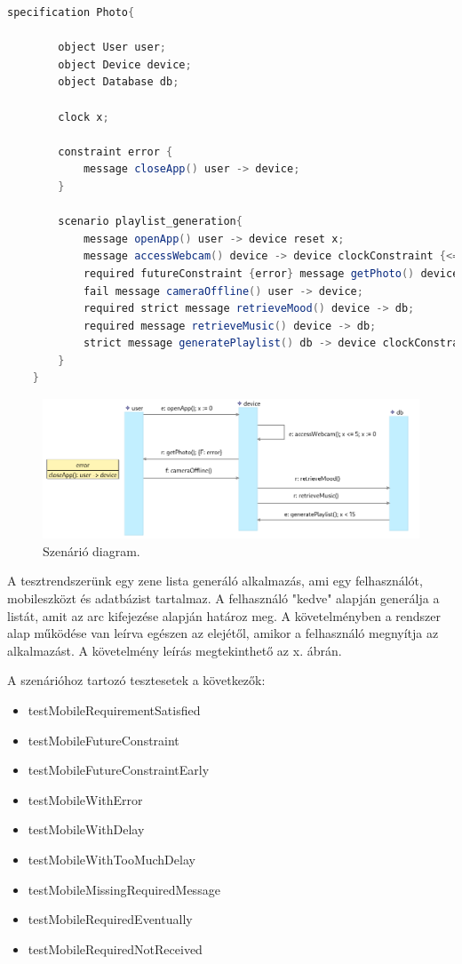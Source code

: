 \begin{lstlisting}[language=java, frame=single, float=ht!, caption={Integrációs teszteset.},captionpos=b]
    specification Photo{

        object User user;
        object Device device;
        object Database db;

        clock x;

        constraint error {
            message closeApp() user -> device;
        }

        scenario playlist_generation{
            message openApp() user -> device reset x;
            message accessWebcam() device -> device clockConstraint {<=(x, 5)} reset x;
            required futureConstraint {error} message getPhoto() device -> user;
            fail message cameraOffline() user -> device;
            required strict message retrieveMood() device -> db;
            required message retrieveMusic() device -> db;
            strict message generatePlaylist() db -> device clockConstraint {<(x, 15)};
        }
    }
\end{lstlisting}

\begin{figure}[!ht]
    \centering
    \includegraphics[width=150mm, keepaspectratio]{figures/diagramMobileExample.png}
    \caption{Szenárió diagram.}
\end{figure}

A tesztrendszerünk egy zene lista generáló alkalmazás, ami egy felhasználót, mobileszközt és adatbázist tartalmaz.
A felhasználó "kedve" alapján generálja a listát, amit az arc kifejezése alapján határoz meg.
A követelményben a rendszer alap működése van leírva egészen az elejétől, amikor a felhasználó megnyítja az alkalmazást.
A követelmény leírás megtekinthető az x. ábrán.

A szenárióhoz tartozó tesztesetek a következők:

\begin{itemize}
    \item testMobileRequirementSatisfied
    \item testMobileFutureConstraint
    \item testMobileFutureConstraintEarly
    \item testMobileWithError
    \item testMobileWithDelay
    \item testMobileWithTooMuchDelay
    \item testMobileMissingRequiredMessage
    \item testMobileRequiredEventually
    \item testMobileRequiredNotReceived
\end{itemize}

